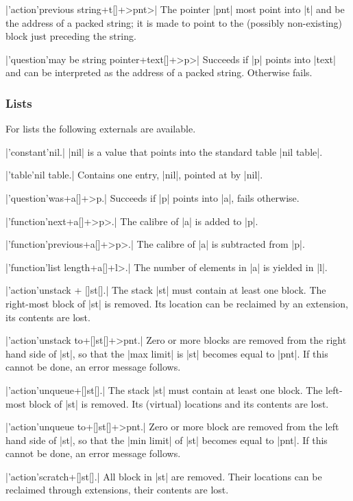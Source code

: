\documentclass{article}
\newcommand\g[1]{{\sf #1}}
\begin{document}
\X\pp|'action'previous string+t[]+>pnt>|\Y
The pointer \pp|pnt| most point into \pp|t| and be the address of a packed
string; it is made to point to the (possibly non-existing) block just
preceding the string.

\X\pp|'question'may be string pointer+text[]+>p>|\Y
Succeeds if \pp|p| points into \pp|text| and can be interpreted as the
address of a packed string. Otherwise fails.

\subsubsection{Lists}\label{5.2.4}

For lists the following externals are available.

\X\pp|'constant'nil.|\Y
\pp|nil| is a value that points into the standard table \pp|nil table|.

\X\pp|'table'nil table.|\Y
Contains one entry, \pp|nil|, pointed at by \pp|nil|.

\X\pp|'question'was+a[]+>p.|\Y
Succeeds if \pp|p| points into \pp|a|, fails otherwise.

\X\pp|'function'next+a[]+>p>.|\Y
The calibre of \pp|a| is added to \pp|p|.

\X\pp|'function'previous+a[]+>p>.|\Y
The calibre of \pp|a| is subtracted from \pp|p|.

\X\pp|'function'list length+a[]+l>.|\Y
The number of elements in \pp|a| is yielded in \pp|l|.

\X\pp|'action'unstack + []st[].|\Y
The stack \pp|st| must contain at least one block. The right-most block of
\pp|st| is removed. Its location can be reclaimed by an \g{extension}, its
contents are lost.

\X\pp|'action'unstack to+[]st[]+>pnt.|\Y
Zero or more blocks are removed from the right hand side of \pp|st|, so that
the \pp|max limit| is \pp|st| becomes equal to \pp|pnt|. If this cannot be
done, an error message follows.

\X\pp|'action'unqueue+[]st[].|\Y
The stack \pp|st| must contain at least one block. The left-most block of
\pp|st| is removed. Its (virtual) locations and its contents are lost.

\X\pp|'action'unqueue to+[]st[]+>pnt.|\Y
Zero or more block are removed from the left hand side of \pp|st|, so that
the \pp|min limit| of \pp|st|  becomes equal to \pp|pnt|. If this cannot be
done, an error message follows.

\X\pp|'action'scratch+[]st[].|\Y
All block in \pp|st| are removed. Their locations can be reclaimed through
\g{extension}s, their contents are lost.
\end{document}
